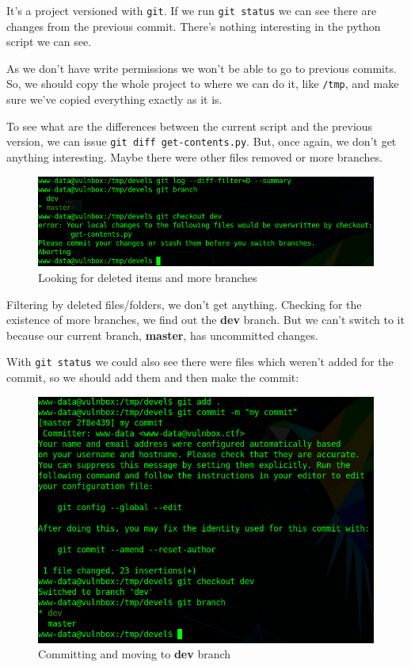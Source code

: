 \documentclass[12pt]{article}
\begin{document}
    It's a project versioned with \texttt{git}. If we run \verb!git status! we
    can see there are changes from the previous commit. There's nothing
    interesting in the python script we can see.

    As we don't have write permissions we won't be able to go to previous
    commits. So, we should copy the whole project to where we can do it, like
    \texttt{/tmp}, and make sure we've copied everything exactly as it is.

    To see what are the differences between the current script and the previous
    version, we can issue \verb!git diff get-contents.py!. But, once again, we
    don't get anything interesting. Maybe there were other files removed or
    more branches.

    \begin{figure}[H]\label{pic:43-git-branch}
        \centering
        \includegraphics[width=1.00\textwidth]{43-git-branch.png}
        \caption{Looking for deleted items and more branches}
    \end{figure}

    Filtering by deleted files/folders, we don't get anything. Checking for the
    existence of more branches, we find out the \textbf{dev} branch. But we
    can't switch to it because our current branch, \textbf{master}, has
    uncommitted changes.

    With \texttt{git status} we could also see there were files which weren't
    added for the commit, so we should add them and then make the commit:

    \begin{figure}[H]\label{pic:44-git-checkout-dev}
        \centering
        \includegraphics[width=1.00\textwidth]{44-git-checkout-dev.png}
        \caption{Committing and moving to \textbf{dev} branch}
    \end{figure}
\end{document}
